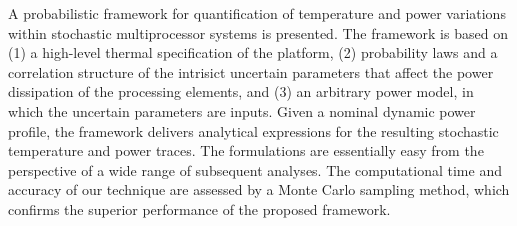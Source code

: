 A probabilistic framework for quantification of temperature and power variations within stochastic multiprocessor systems is presented. The framework is based on (1) a high-level thermal specification of the platform, (2) probability laws and a correlation structure of the intrisict uncertain parameters that affect the power dissipation of the processing elements, and (3) an arbitrary power model, in which the uncertain parameters are inputs. Given a nominal dynamic power profile, the framework delivers analytical expressions for the resulting stochastic temperature and power traces. The formulations are essentially easy from the perspective of a wide range of subsequent analyses. The computational time and accuracy of our technique are assessed by a Monte Carlo sampling method, which confirms the superior performance of the proposed framework.
